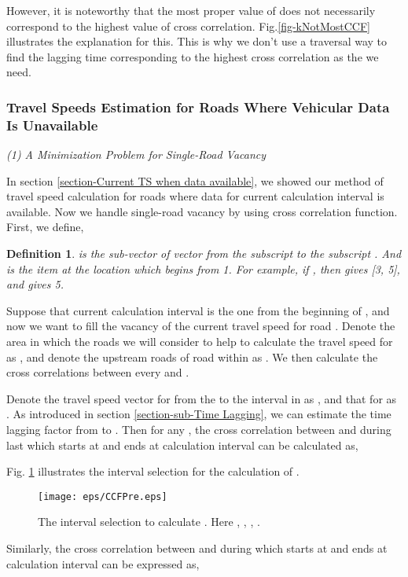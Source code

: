 \documentclass[twocolumn,10pt,final,conference]{IEEEtran}
\newtheorem{defn}{Definition}
\begin{document}
However, it is noteworthy that the most proper value of   does not necessarily correspond to the highest value of cross correlation. Fig.\ref{fig-kNotMostCCF} illustrates the explanation for this. This is why we don't use a traversal way to find the lagging time corresponding to the highest cross correlation as the  we need.


\subsubsection{Travel Speeds Estimation for Roads Where Vehicular Data Is Unavailable}\label{section-Instant Travel Speed Estimation}
\quad

\emph{(1) A Minimization Problem for Single-Road Vacancy}
\quad

In section \ref{section-Current TS when data available}, we showed our method of travel speed calculation for roads where data for current calculation interval is available. Now we handle single-road vacancy by using cross correlation function.
First, we define,
\begin{defn}
 is the sub-vector of vector  from the subscript   to the subscript .  And  is the item at the location  which begins from 1. For example, if , then  gives [3, 5], and  gives 5.
\end{defn}

Suppose that current calculation interval is the  one from the beginning of , and now we want to fill the vacancy of the current travel speed for road . Denote the area in which the roads we will consider to help to calculate the travel speed for  as , and denote the upstream roads of road  within  as . We then calculate the cross correlations between every  and .

Denote the travel speed vector for  from the  to the  interval in  as , and that for  as . As introduced in section \ref{section-sub-Time Lagging}, we can estimate the time lagging factor from  to . Then for any , the cross correlation between  and  during last  which starts at  and ends at  calculation interval can be calculated as,

Fig. \ref{fig-illustration of CCFPre} illustrates the interval selection for the calculation of .

\begin{figure}[!h]
  \centering
\texttt{[image: eps/CCFPre.eps]}\\
  \caption{The interval selection to calculate . Here , , , .}
  \label{fig-illustration of CCFPre}
\end{figure}
Similarly, the cross correlation between  and  during   which starts at  and ends at  calculation interval can be expressed as,
\end{document}
